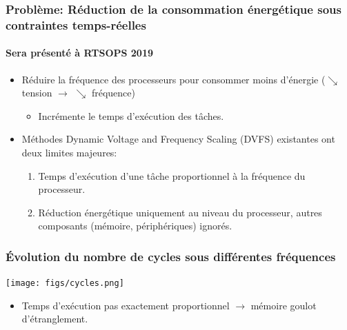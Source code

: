 \documentclass[xcolor=table]{beamer}
\begin{document}
\begin{frame}
	\frametitle{Problème: Réduction de la consommation énergétique sous contraintes temps-réelles}
	\framesubtitle{Sera présenté à RTSOPS 2019}
	\begin{itemize}
		\item Réduire la fréquence des processeurs pour consommer moins d'énergie ($\searrow$ tension 
		$\rightarrow$ $\searrow$ fréquence)
		\begin{itemize}
			\item Incrémente le temps d'exécution des tâches.
		\end{itemize}
		\item Méthodes Dynamic Voltage and Frequency Scaling (DVFS) existantes ont deux limites majeures:
		\begin{enumerate}
			\item Temps d'exécution d'une tâche proportionnel à la fréquence du processeur.
			\item Réduction énergétique uniquement au niveau du processeur, autres composants (mémoire, 
			périphériques) ignorés.
		\end{enumerate}
	\end{itemize}
	
\end{frame}

\begin{frame}
	\frametitle{Évolution du nombre de cycles sous différentes fréquences}
	\centering
	\texttt{[image: figs/cycles.png]}
	\vspace{-.5cm}
	\begin{itemize}
		\item Temps d'exécution pas exactement proportionnel $\rightarrow$ mémoire goulot d'étranglement.
	\end{itemize}
\end{frame}
\end{document}
